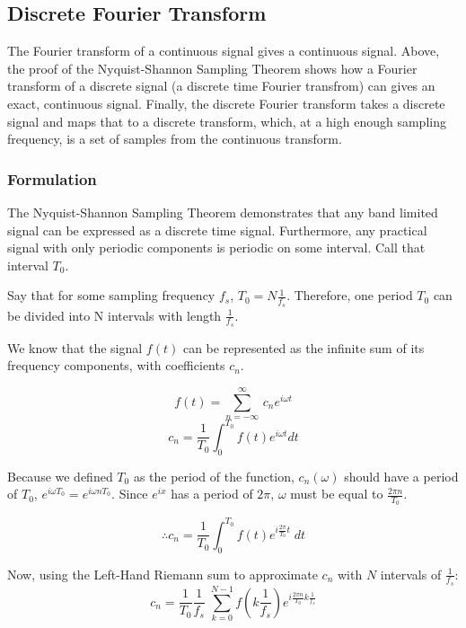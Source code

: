 \documentclass[12pt]{article}
\begin{document}

\subsection{Discrete Fourier Transform}

The Fourier transform of a continuous signal gives a continuous signal. Above,
the proof of the Nyquist-Shannon Sampling Theorem shows how a Fourier transform
of a discrete signal (a discrete time Fourier transfrom) can gives an exact, continuous signal. Finally, the
discrete Fourier transform takes a discrete signal and maps that to a discrete
transform, which, at a high enough sampling frequency, is a set of samples from
the continuous transform.

\subsubsection{Formulation}

The Nyquist-Shannon Sampling Theorem demonstrates that any band limited signal
can be expressed as a discrete time signal. Furthermore, any practical signal
with only periodic components is periodic on some interval. Call that interval
\( T_0\). 

Say that for some sampling frequency \(f_s\), \(T_0 = N\frac{1}{f_{s}} \).
Therefore, one period \( T_0\) can be divided into N intervals with length \(
\frac{1}{f_{s}}\).

We know that the signal \(f(t)\) can be represented as the infinite sum of its
frequency components, with coefficients \(c_n\).

\[ f(t) = \sum_{n = -\infty}^{\infty} \,c_n e^{i\omega t} \] \[ c_{n} =
\frac{1}{T_0} \int_{0}^{T_0} f(t) e^{i\omega t} dt\]

Because we defined \(T_0\) as the period of the function, \(c_{n}(\omega) \)
should have a period of \( T_0\), \(e^{i\omega T_0} = e^{i\omega nT_0}\). Since
\(e^{i x}\) has a period of \( 2\pi \), \( \omega \) must be equal to
\(\frac{2\pi n}{T_0} \). 

\[ \therefore c_{n} = \frac{1}{T_0} \int_{0}^{T_0} f(t) e^{i \frac{2\pi}{T_0} t
} \; dt\] 

Now, using the Left-Hand Riemann sum to approximate \( c_n\) with \( N\)
intervals of \( \frac{1}{f_s} \): \[ c_{n} = \frac{1}{T_0} \frac{1}{f_s} \;
\sum_{k = 0}^{N-1} f(k \frac{1}{f_s}) e^{i \frac{2\pi n}{T_0} k\frac{1}{f_s}}
\]
\end{document}
